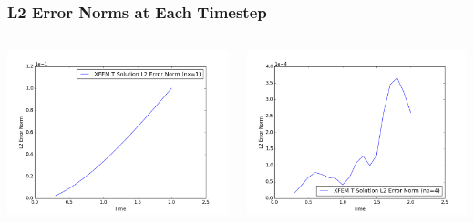 \documentclass[]{beamer}
\begin{document}
\begin{frame}[t]\frametitle{L2 Error Norms at Each Timestep}
  	\begin{columns}
			\begin{center}
			\includegraphics[scale=0.3]{figures/1D_rz_homog1mat_nx1_L2_Errs}
			\end{center}
			\begin{center}
			\includegraphics[scale=0.3]{figures/1D_rz_homog1mat_nx4_L2_Errs}
			\end{center}
	\end{columns}
\end{frame}
\end{document}

